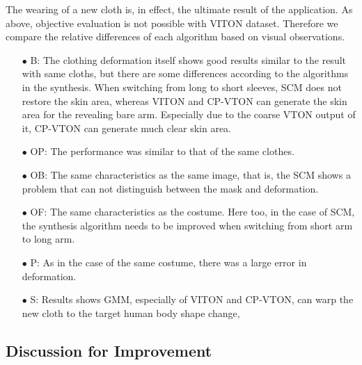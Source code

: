 The wearing of a new cloth is, in effect, the ultimate result of the application. As above, objective evaluation is not possible with VITON dataset. Therefore we compare the relative differences of each algorithm based on visual observations.

\begin{itemize}

\item[$\bullet$] B: The clothing deformation itself shows good results similar to the result with same cloths, but there are some differences according to the algorithms in the synthesis. When switching from long to short sleeves, SCM does not restore the skin area, whereas VITON and CP-VTON can generate the skin area for the revealing bare arm. Especially due to the coarse VTON output of it, CP-VTON can generate much clear skin area.

\item[$\bullet$] OP: The performance was similar to that of the same clothes.

\item[$\bullet$] OB: The same characteristics as the same image, that is, the SCM shows a problem that can not distinguish between the mask and deformation.

\item[$\bullet$] OF: The same characteristics as the costume. Here too, in the case of SCM, the synthesis algorithm needs to be improved when switching from short arm to long arm.

\item[$\bullet$] P: As in the case of the same costume, there was a large error in deformation.

\item[$\bullet$] S: Results shows GMM, especially of VITON and CP-VTON, can warp the new cloth to the target human body shape change, 

\end{itemize}


 
\subsection{Discussion for Improvement}

